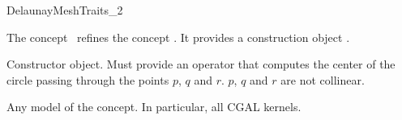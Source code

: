 \begin{ccRefConcept}{DelaunayMeshTraits_2}

\ccDefinition

The concept \ccRefName\ refines the concept
. It provides a construction
object .

\ccRefines


\ccTypes

 {Constructor object. Must provide
  an operator 
  that computes the center of the circle passing through the points $p$,
  $q$ and $r$.
  \ccPrecond $p$, $q$ and $r$ are not collinear.}




\ccHasModels
Any model of the  concept. In particular, all CGAL kernels.

\end{ccRefConcept}

